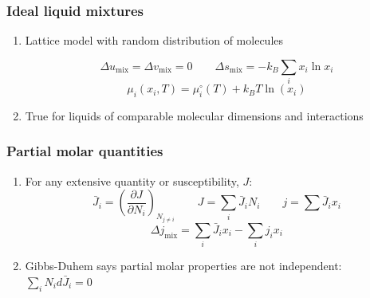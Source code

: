 \documentclass[11pt]{article}
\begin{document}
\subsubsection{Ideal liquid mixtures}
\label{sec:org5e23ba2}
\begin{enumerate}
\item Lattice model with random distribution of molecules

\begin{equation*}
\Delta u_\text{mix} = \Delta v_\text{mix} = 0 \qquad \Delta s_\text{mix} = - k_B \sum_i x_i \ln x_i
\end{equation*}
\begin{equation*}
\mu_i(x_i,T) = \mu_i^\circ(T) + k_B T \ln \left ( x_i \right)
\end{equation*}

\item True for liquids of comparable molecular dimensions and interactions
\end{enumerate}
\subsubsection{Partial molar quantities}
\label{sec:orge9e2b48}
\begin{enumerate}
\item For any extensive quantity or susceptibility, \(J\):
     \begin{equation*}
\bar{J}_i = \left ( \frac{\partial J}{\partial N_i} \right )_{N_{j\neq i}}
     \qquad J = \sum_i \bar{J}_i N_i \qquad j = \sum \bar{J}_i x_i
     \end{equation*}
\begin{equation*}
\Delta j_\text{mix} = \sum_i \bar{J}_ix_i - \sum_i j_i x_i
\end{equation*}
\item Gibbs-Duhem says partial molar properties are not independent: \(\sum_i N_i d\bar{J}_i = 0\)
\end{enumerate}
\end{document}
